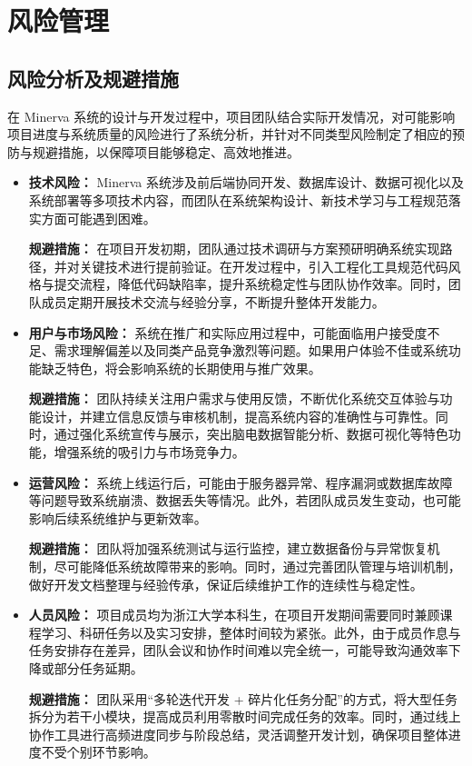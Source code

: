 \section{风险管理}

\subsection{风险分析及规避措施}

在 Minerva 系统的设计与开发过程中，项目团队结合实际开发情况，对可能影响项目进度与系统质量的风险进行了系统分析，并针对不同类型风险制定了相应的预防与规避措施，以保障项目能够稳定、高效地推进。

\begin{itemize}

	\item \textbf{技术风险：} Minerva 系统涉及前后端协同开发、数据库设计、数据可视化以及系统部署等多项技术内容，而团队在系统架构设计、新技术学习与工程规范落实方面可能遇到困难。
	
	\textbf{规避措施：} 在项目开发初期，团队通过技术调研与方案预研明确系统实现路径，并对关键技术进行提前验证。在开发过程中，引入工程化工具规范代码风格与提交流程，降低代码缺陷率，提升系统稳定性与团队协作效率。同时，团队成员定期开展技术交流与经验分享，不断提升整体开发能力。

	\item \textbf{用户与市场风险：} 系统在推广和实际应用过程中，可能面临用户接受度不足、需求理解偏差以及同类产品竞争激烈等问题。如果用户体验不佳或系统功能缺乏特色，将会影响系统的长期使用与推广效果。
	
	\textbf{规避措施：} 团队持续关注用户需求与使用反馈，不断优化系统交互体验与功能设计，并建立信息反馈与审核机制，提高系统内容的准确性与可靠性。同时，通过强化系统宣传与展示，突出脑电数据智能分析、数据可视化等特色功能，增强系统的吸引力与市场竞争力。

	\item \textbf{运营风险：} 系统上线运行后，可能由于服务器异常、程序漏洞或数据库故障等问题导致系统崩溃、数据丢失等情况。此外，若团队成员发生变动，也可能影响后续系统维护与更新效率。
	
	\textbf{规避措施：} 团队将加强系统测试与运行监控，建立数据备份与异常恢复机制，尽可能降低系统故障带来的影响。同时，通过完善团队管理与培训机制，做好开发文档整理与经验传承，保证后续维护工作的连续性与稳定性。

	\item \textbf{人员风险：} 项目成员均为浙江大学本科生，在项目开发期间需要同时兼顾课程学习、科研任务以及实习安排，整体时间较为紧张。此外，由于成员作息与任务安排存在差异，团队会议和协作时间难以完全统一，可能导致沟通效率下降或部分任务延期。
	
	\textbf{规避措施：} 团队采用“多轮迭代开发 + 碎片化任务分配”的方式，将大型任务拆分为若干小模块，提高成员利用零散时间完成任务的效率。同时，通过线上协作工具进行高频进度同步与阶段总结，灵活调整开发计划，确保项目整体进度不受个别环节影响。

\end{itemize}

